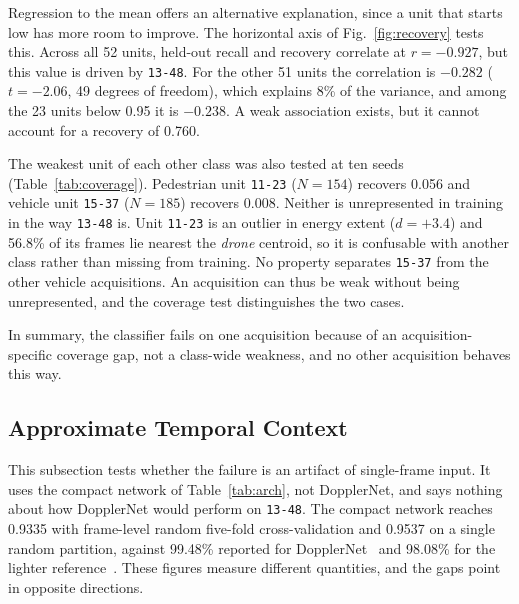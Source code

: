 \documentclass[conference]{IEEEtran}
\begin{document}
Regression to the mean offers an alternative explanation, since a unit that starts low has more room to improve. The horizontal axis of Fig.~\ref{fig:recovery} tests this. Across all 52 units, held-out recall and recovery correlate at $r=-0.927$, but this value is driven by \texttt{13-48}. For the other 51 units the correlation is $-0.282$ ($t=-2.06$, 49 degrees of freedom), which explains 8\% of the variance, and among the 23 units below 0.95 it is $-0.238$. A weak association exists, but it cannot account for a recovery of 0.760.

The weakest unit of each other class was also tested at ten seeds (Table~\ref{tab:coverage}). Pedestrian unit \texttt{11-23} ($N=154$) recovers 0.056 and vehicle unit \texttt{15-37} ($N=185$) recovers 0.008. Neither is unrepresented in training in the way \texttt{13-48} is. Unit \texttt{11-23} is an outlier in energy extent ($d=+3.4$) and 56.8\% of its frames lie nearest the \emph{drone} centroid, so it is confusable with another class rather than missing from training. No property separates \texttt{15-37} from the other vehicle acquisitions. An acquisition can thus be weak without being unrepresented, and the coverage test distinguishes the two cases.

In summary, the classifier fails on one acquisition because of an acquisition-specific coverage gap, not a class-wide weakness, and no other acquisition behaves this way.

\subsection{Approximate Temporal Context}
\label{sec:inputgap}

This subsection tests whether the failure is an artifact of single-frame input. It uses the compact network of Table~\ref{tab:arch}, not DopplerNet, and says nothing about how DopplerNet would perform on \texttt{13-48}. The compact network reaches 0.9335 with frame-level random five-fold cross-validation and 0.9537 on a single random partition, against 99.48\% reported for DopplerNet~\cite{roldan2020} and 98.08\% for the lighter reference~\cite{zhang2025}. These figures measure different quantities, and the gaps point in opposite directions.
\end{document}
